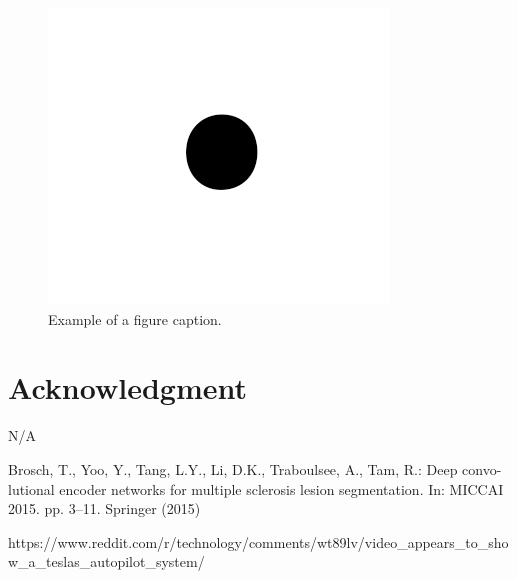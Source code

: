 \documentclass[Location Location Location! : Exploring Image Segmentation Problem In Urban Driving Scenarios]{IEEEtran}
\begin{document}
\begin{figure}[htbp]
\centerline{\includegraphics{fig1.png}}
\caption{Example of a figure caption.}
\label{fig}
\end{figure}

\section*{Acknowledgment}

N/A

\begin{thebibliography}{00}
 Brosch, T., Yoo, Y., Tang, L.Y., Li, D.K., Traboulsee, A., Tam, R.: Deep convo-
lutional encoder networks for multiple sclerosis lesion segmentation. In: MICCAI
2015. pp. 3–11. Springer (2015)



 https://www.reddit.com/r/technology/comments/wt89lv/video_appears_to_show_a_teslas_autopilot_system/


\end{thebibliography}
\vspace{12pt}
\end{document}

